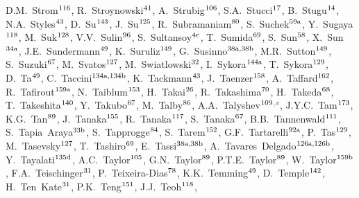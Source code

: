 \begin{flushleft}
D.M.~Strom$^\textrm{\scriptsize 116}$,
R.~Stroynowski$^\textrm{\scriptsize 41}$,
A.~Strubig$^\textrm{\scriptsize 106}$,
S.A.~Stucci$^\textrm{\scriptsize 17}$,
B.~Stugu$^\textrm{\scriptsize 14}$,
N.A.~Styles$^\textrm{\scriptsize 43}$,
D.~Su$^\textrm{\scriptsize 143}$,
J.~Su$^\textrm{\scriptsize 125}$,
R.~Subramaniam$^\textrm{\scriptsize 80}$,
S.~Suchek$^\textrm{\scriptsize 59a}$,
Y.~Sugaya$^\textrm{\scriptsize 118}$,
M.~Suk$^\textrm{\scriptsize 128}$,
V.V.~Sulin$^\textrm{\scriptsize 96}$,
S.~Sultansoy$^\textrm{\scriptsize 4c}$,
T.~Sumida$^\textrm{\scriptsize 69}$,
S.~Sun$^\textrm{\scriptsize 58}$,
X.~Sun$^\textrm{\scriptsize 34a}$,
J.E.~Sundermann$^\textrm{\scriptsize 49}$,
K.~Suruliz$^\textrm{\scriptsize 149}$,
G.~Susinno$^\textrm{\scriptsize 38a,38b}$,
M.R.~Sutton$^\textrm{\scriptsize 149}$,
S.~Suzuki$^\textrm{\scriptsize 67}$,
M.~Svatos$^\textrm{\scriptsize 127}$,
M.~Swiatlowski$^\textrm{\scriptsize 32}$,
I.~Sykora$^\textrm{\scriptsize 144a}$,
T.~Sykora$^\textrm{\scriptsize 129}$,
D.~Ta$^\textrm{\scriptsize 49}$,
C.~Taccini$^\textrm{\scriptsize 134a,134b}$,
K.~Tackmann$^\textrm{\scriptsize 43}$,
J.~Taenzer$^\textrm{\scriptsize 158}$,
A.~Taffard$^\textrm{\scriptsize 162}$,
R.~Tafirout$^\textrm{\scriptsize 159a}$,
N.~Taiblum$^\textrm{\scriptsize 153}$,
H.~Takai$^\textrm{\scriptsize 26}$,
R.~Takashima$^\textrm{\scriptsize 70}$,
H.~Takeda$^\textrm{\scriptsize 68}$,
T.~Takeshita$^\textrm{\scriptsize 140}$,
Y.~Takubo$^\textrm{\scriptsize 67}$,
M.~Talby$^\textrm{\scriptsize 86}$,
A.A.~Talyshev$^\textrm{\scriptsize 109}$$^{,c}$,
J.Y.C.~Tam$^\textrm{\scriptsize 173}$,
K.G.~Tan$^\textrm{\scriptsize 89}$,
J.~Tanaka$^\textrm{\scriptsize 155}$,
R.~Tanaka$^\textrm{\scriptsize 117}$,
S.~Tanaka$^\textrm{\scriptsize 67}$,
B.B.~Tannenwald$^\textrm{\scriptsize 111}$,
S.~Tapia~Araya$^\textrm{\scriptsize 33b}$,
S.~Tapprogge$^\textrm{\scriptsize 84}$,
S.~Tarem$^\textrm{\scriptsize 152}$,
G.F.~Tartarelli$^\textrm{\scriptsize 92a}$,
P.~Tas$^\textrm{\scriptsize 129}$,
M.~Tasevsky$^\textrm{\scriptsize 127}$,
T.~Tashiro$^\textrm{\scriptsize 69}$,
E.~Tassi$^\textrm{\scriptsize 38a,38b}$,
A.~Tavares~Delgado$^\textrm{\scriptsize 126a,126b}$,
Y.~Tayalati$^\textrm{\scriptsize 135d}$,
A.C.~Taylor$^\textrm{\scriptsize 105}$,
G.N.~Taylor$^\textrm{\scriptsize 89}$,
P.T.E.~Taylor$^\textrm{\scriptsize 89}$,
W.~Taylor$^\textrm{\scriptsize 159b}$,
F.A.~Teischinger$^\textrm{\scriptsize 31}$,
P.~Teixeira-Dias$^\textrm{\scriptsize 78}$,
K.K.~Temming$^\textrm{\scriptsize 49}$,
D.~Temple$^\textrm{\scriptsize 142}$,
H.~Ten~Kate$^\textrm{\scriptsize 31}$,
P.K.~Teng$^\textrm{\scriptsize 151}$,
J.J.~Teoh$^\textrm{\scriptsize 118}$,
$$
\end{flushleft}
